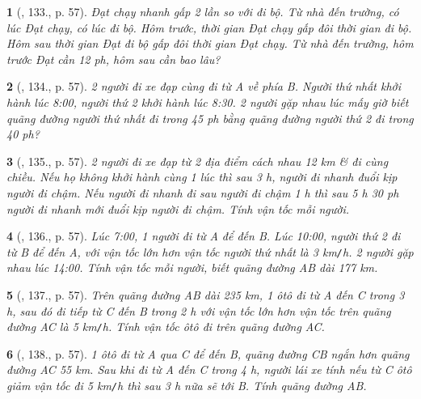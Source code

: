 \documentclass{article}
\newtheorem{baitoan}{}
\begin{document}
\begin{baitoan}[\cite{Binh_Toan_6_tap_2}, 133., p. 57]
	Đạt chạy nhanh gấp 2 lần so với đi bộ. Từ nhà đến trường, có lúc Đạt chạy, có lúc đi bộ. Hôm trước, thời gian Đạt chạy gấp đôi thời gian đi bộ. Hôm sau thời gian Đạt đi bộ gấp đôi thời gian Đạt chạy. Từ nhà đến trường, hôm trước Đạt cần {\rm12 ph}, hôm sau cần bao lâu?
\end{baitoan}

\begin{baitoan}[\cite{Binh_Toan_6_tap_2}, 134., p. 57]
	2 người đi xe đạp cùng đi từ A về phía B. Người thứ nhất khởi hành lúc {\rm8:00}, người thứ 2 khởi hành lúc {\rm8:30}. 2 người gặp nhau lúc mấy giờ biết quãng đường người thứ nhất đi trong {\rm45 ph} bằng quãng đường người thứ 2 đi trong {\rm40 ph}?
\end{baitoan}

\begin{baitoan}[\cite{Binh_Toan_6_tap_2}, 135., p. 57]
	2 người đi xe đạp từ 2 địa điểm cách nhau {\rm12 km} \& đi cùng chiều. Nếu họ không khởi hành cùng 1 lúc thì sau {\rm3 h}, người đi nhanh đuổi kịp người đi chậm. Nếu người đi nhanh đi sau người đi chậm {\rm1 h} thì sau {\rm5 h 30 ph} người đi nhanh mới đuổi kịp người đi chậm. Tính vận tốc mỗi người.
\end{baitoan}

\begin{baitoan}[\cite{Binh_Toan_6_tap_2}, 136., p. 57]
	Lúc {\rm7:00}, 1 người đi từ A để đến B. Lúc {\rm10:00}, người thứ 2 đi từ B để đến A, với vận tốc lớn hơn vận tốc người thứ nhất là {\rm3 km{\tt/}h}. 2 người gặp nhau lúc {\rm14:00}. Tính vận tốc mỗi người, biết quãng đường AB dài {\rm177 km}.
\end{baitoan}

\begin{baitoan}[\cite{Binh_Toan_6_tap_2}, 137., p. 57]
	Trên quãng đường AB dài {\rm235 km}, 1 ôtô đi từ A đến C trong {\rm3 h}, sau đó đi tiếp từ C đến B trong {\rm2 h} với vận tốc lớn hơn vận tốc trên quãng đường AC là {\rm5 km{\tt/}h}. Tính vận tốc ôtô đi trên quãng đường AC.
\end{baitoan}

\begin{baitoan}[\cite{Binh_Toan_6_tap_2}, 138., p. 57]
	1 ôtô đi từ A qua C để đến B, quãng đường CB ngắn hơn quãng đường AC {\rm55 km}. Sau khi đi từ A đến C trong {\rm4 h}, người lái xe tính nếu từ C ôtô giảm vận tốc đi {\rm5 km{\tt/}h} thì sau {\rm3 h} nữa sẽ tới B. Tính quãng đường AB.
\end{baitoan}
\end{document}
